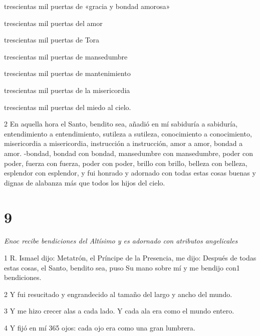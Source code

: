 \par trescientas mil puertas de «gracia y bondad amorosa»

\par trescientas mil puertas del amor

\par trescientas mil puertas de Tora

\par trescientas mil puertas de mansedumbre

\par trescientas mil puertas de mantenimiento

\par trescientas mil puertas de la misericordia

\par trescientas mil puertas del miedo al cielo.

\par 2 En aquella hora el Santo, bendito sea, añadió en mí sabiduría a sabiduría, entendimiento a entendimiento, sutileza a sutileza, conocimiento a conocimiento, misericordia a misericordia, instrucción a instrucción, amor a amor, bondad a amor. -bondad, bondad con bondad, mansedumbre con mansedumbre, poder con poder, fuerza con fuerza, poder con poder, brillo con brillo, belleza con belleza, esplendor con esplendor, y fui honrado y adornado con todas estas cosas buenas y dignas de alabanza más que todos los hijos del cielo.


\chapter{9}

\par \textit{Enoc recibe bendiciones del Altísimo y es adornado con atributos angelicales}

\par 1 R. Ismael dijo: Metatrón, el Príncipe de la Presencia, me dijo: Después de todas estas cosas, el Santo, bendito sea, puso Su mano sobre mí y me bendijo con1 bendiciones.

\par 2 Y fui resucitado y engrandecido al tamaño del largo y ancho del mundo.

\par 3 Y me hizo crecer alas a cada lado. Y cada ala era como el mundo entero.

\par 4 Y fijó en mí 365 ojos: cada ojo era como una gran lumbrera.

